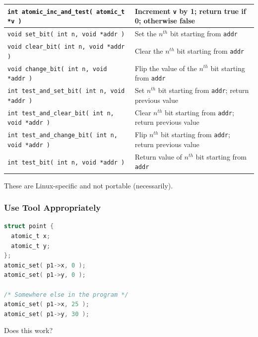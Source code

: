 \begin{frame}
{\begin{center}
\begin{tabular}{l|l}
\texttt{int atomic\_inc\_and\_test( atomic\_t *v )} & Increment \texttt{v} by 1; return true if 0; otherwise false\\ \hline\hline

\texttt{void set\_bit( int n, void *addr )} &  Set the $n^{th}$ bit starting from \texttt{addr}\\\hline

\texttt{void clear\_bit( int n, void *addr )} &  Clear the $n^{th}$ bit starting from \texttt{addr}\\\hline

\texttt{void change\_bit( int n, void *addr )} &  Flip the value of the $n^{th}$ bit starting from \texttt{addr}\\\hline

\texttt{int test\_and\_set\_bit( int n, void *addr )} &  Set $n^{th}$ bit starting from \texttt{addr}; return previous value\\\hline

\texttt{int test\_and\_clear\_bit( int n, void *addr )} &  Clear $n^{th}$ bit starting from \texttt{addr}; return previous value\\\hline

\texttt{int test\_and\_change\_bit( int n, void *addr )} &  Flip $n^{th}$ bit starting from \texttt{addr}; return previous value\\\hline

\texttt{int test\_bit( int n, void *addr )} &  Return value of $n^{th}$ bit starting from \texttt{addr}\\\hline

\end{tabular}
\end{center}
}

These are Linux-specific and not portable (necessarily).

\end{frame}


\begin{frame}[fragile]
\frametitle{Use Tool Appropriately}

\begin{lstlisting}[language=C]
struct point {
  atomic_t x;
  atomic_t y;
};
atomic_set( p1->x, 0 );
atomic_set( p1->y, 0 );

/* Somewhere else in the program */
atomic_set( p1->x, 25 );
atomic_set( p1->y, 30 );
\end{lstlisting}

Does this work?

\end{frame}


